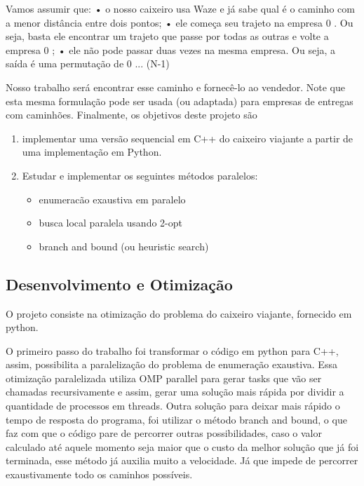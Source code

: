 \documentclass[11pt]{article}
\providecommand{\tightlist}{%
      \setlength{\itemsep}{0pt}\setlength{\parskip}{0pt}}
\begin{document}
Vamos assumir que: • o nosso caixeiro usa Waze e já sabe qual é o
caminho com a menor distância entre dois pontos; • ele começa seu
trajeto na empresa 0 . Ou seja, basta ele encontrar um trajeto que passe
por todas as outras e volte a empresa 0 ; • ele não pode passar duas
vezes na mesma empresa. Ou seja, a saída é uma permutação de 0 ... (N-1)

Nosso trabalho será encontrar esse caminho e fornecê-lo ao vendedor.
Note que esta mesma formulação pode ser usada (ou adaptada) para
empresas de entregas com caminhões. Finalmente, os objetivos deste
projeto são

\begin{enumerate}
\def\labelenumi{\arabic{enumi}.}
\tightlist
\item
  implementar uma versão sequencial em C++ do caixeiro viajante a partir
  de uma implementação em Python.
\item
  Estudar e implementar os seguintes métodos paralelos:

  \begin{itemize}
  \tightlist
  \item
    enumeracão exaustiva em paralelo
  \item
    busca local paralela usando 2-opt
  \item
    branch and bound (ou heuristic search)
  \end{itemize}
\end{enumerate}

    \subsection{Desenvolvimento e
Otimização}\label{desenvolvimento-e-otimizauxe7uxe3o}

O projeto consiste na otimização do problema do caixeiro viajante,
fornecido em python.

O primeiro passo do trabalho foi transformar o código em python para
C++, assim, possibilita a paralelização do problema de enumeração
exaustiva. Essa otimização paralelizada utiliza OMP parallel para gerar
tasks que vão ser chamadas recursivamente e assim, gerar uma solução
mais rápida por dividir a quantidade de processos em threads. Outra
solução para deixar mais rápido o tempo de resposta do programa, foi
utilizar o método branch and bound, o que faz com que o código pare de
percorrer outras possibilidades, caso o valor calculado até aquele
momento seja maior que o custo da melhor solução que já foi terminada,
esse método já auxilia muito a velocidade. Já que impede de percorrer
exaustivamente todo os caminhos possíveis.
\end{document}
